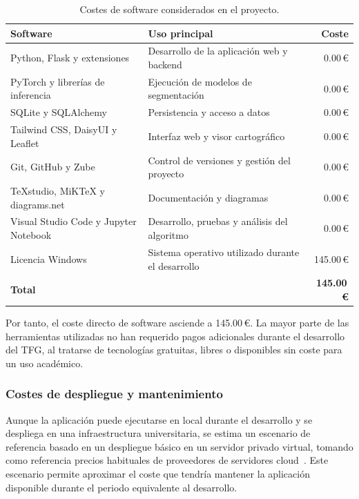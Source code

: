 \begin{table}[]
	\centering
	\small
	\renewcommand{\arraystretch}{1.25}
	\begin{tabular}{p{4cm} p{7cm} r}
		\toprule
		\textbf{Software} & \textbf{Uso principal} & \textbf{Coste} \\
		\midrule
		Python, Flask y extensiones & Desarrollo de la aplicación web y backend & \num{0.00}\,€ \\
		PyTorch y librerías de inferencia & Ejecución de modelos de segmentación & \num{0.00}\,€ \\
		SQLite y SQLAlchemy & Persistencia y acceso a datos & \num{0.00}\,€ \\
		Tailwind CSS, DaisyUI y Leaflet & Interfaz web y visor cartográfico & \num{0.00}\,€ \\
		Git, GitHub y Zube & Control de versiones y gestión del proyecto & \num{0.00}\,€ \\
		TeXstudio, MiKTeX y diagrams.net & Documentación y diagramas & \num{0.00}\,€ \\
		Visual Studio Code y Jupyter Notebook & Desarrollo, pruebas y análisis del algoritmo & \num{0.00}\,€ \\
		Licencia Windows & Sistema operativo utilizado durante el desarrollo & \num{145.00}\,€ \\
		\midrule
		\textbf{Total} & & \textbf{\num{145.00}\,€} \\
		\bottomrule
	\end{tabular}
	\caption{Costes de software considerados en el proyecto.}
	\label{tab:costes_software}
\end{table}

Por tanto, el coste directo de software asciende a \num{145.00}\,€. La mayor parte de las herramientas utilizadas no han requerido pagos adicionales durante el desarrollo del TFG, al tratarse de tecnologías gratuitas, libres o disponibles sin coste para un uso académico.

\subsubsection{Costes de despliegue y mantenimiento}

Aunque la aplicación puede ejecutarse en local durante el desarrollo y se despliega en una infraestructura universitaria, se estima un escenario de referencia basado en un despliegue básico en un servidor privado virtual, tomando como referencia precios habituales de proveedores de servidores cloud~\cite{hetzner_cloud_cx_plans_2024}. Este escenario permite aproximar el coste que tendría mantener la aplicación disponible durante el periodo equivalente al desarrollo.

